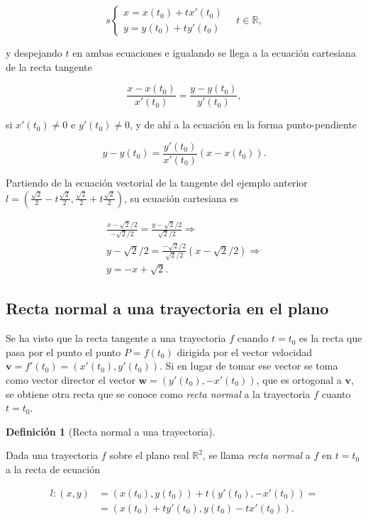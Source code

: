 \documentclass[
  a4paper,
]{scrreport}
\theoremstyle{definition}
\theoremstyle{plain}
\theoremstyle{definition}
\newtheorem{definition}{Definición}[chapter]
\theoremstyle{definition}
\theoremstyle{plain}
\theoremstyle{plain}
\theoremstyle{remark}
\begin{document}
\[
s\begin{cases}
x=x(t_0)+tx'(t_0)\\
y=y(t_0)+ty'(t_0)
\end{cases}
\quad t\in \mathbb{R},
\]

y despejando \(t\) en ambas ecuaciones e igualando se llega a la
ecuación cartesiana de la recta tangente

\[
\frac{x-x(t_0)}{x'(t_0)}=\frac{y-y(t_0)}{y'(t_0)},
\]

si \(x'(t_0)\neq 0\) e \(y'(t_0)\neq 0\), y de ahí a la ecuación en la
forma punto-pendiente

\[
y-y(t_0)=\frac{y'(t_0)}{x'(t_0)}(x-x(t_0)).
\]

Partiendo de la ecuación vectorial de la tangente del ejemplo anterior
\(l=\left(\frac{\sqrt{2}}{2}-t\frac{\sqrt{2}}{2},\frac{\sqrt{2}}{2}+t\frac{\sqrt{2}}{2}\right)\),
su ecuación cartesiana es

\[
\begin{gathered}
\frac{x-\sqrt{2}/2}{-\sqrt{2}/2} = \frac{y-\sqrt{2}/2}{\sqrt{2}/2}\Rightarrow\\
y-\sqrt{2}/2 = \frac{-\sqrt{2}/2}{\sqrt{2}/2}(x-\sqrt{2}/2) \Rightarrow \\
y=-x+\sqrt{2}.
\end{gathered}
\]

\subsection{Recta normal a una trayectoria en el
plano}\label{recta-normal-a-una-trayectoria-en-el-plano}

Se ha visto que la recta tangente a una trayectoria \(f\) cuando
\(t=t_0\) es la recta que pasa por el punto el punto \(P=f(t_0)\)
dirigida por el vector velocidad
\(\mathbf{v}=f'(t_0)=(x'(t_0),y'(t_0))\). Si en lugar de tomar ese
vector se toma como vector director el vector
\(\mathbf{w}=(y'(t_0),-x'(t_0))\), que es ortogonal a \(\mathbf{v}\), se
obtiene otra recta que se conoce como \emph{recta normal} a la
trayectoria \(f\) cuanto \(t=t_0\).

\begin{definition}[Recta normal a una
trayectoria]\protect\hypertarget{def-normal-trayectoria}{}\label{def-normal-trayectoria}

Dada una trayectoria \(f\) sobre el plano real \(\mathbb{R}^2\), se
llama \emph{recta normal} a \(f\) en \(t=t_0\) a la recta de ecuación

\begin{align*}
l: (x,y) &= (x(t_0),y(t_0))+t(y'(t_0),-x'(t_0)) =\\
&= (x(t_0)+ty'(t_0),y(t_0)-tx'(t_0)).
\end{align*}

\end{definition}
\end{document}
